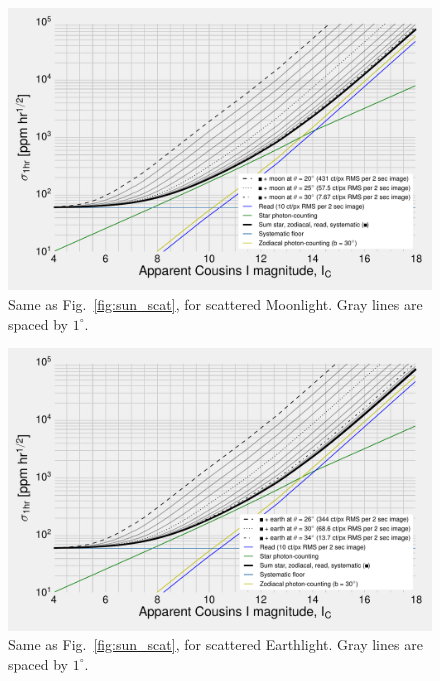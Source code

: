 \begin{figure}[!t]
	\centering
	\includegraphics{figures/precision_angles_moon.pdf}
	\caption{Same as Fig.~\protect\ref{fig:sun_scat}, for scattered Moonlight.
		Gray lines are spaced by $1^\circ$.} 
	\label{fig:moon_scat}
\end{figure}
\begin{figure}[!t]
	\centering
	\includegraphics{figures/precision_angles_earth.pdf}
	\caption{Same as Fig.~\protect\ref{fig:sun_scat}, for scattered 
	Earthlight. Gray lines are spaced by $1^\circ$.} 
	\label{fig:earth_scat}
\end{figure}